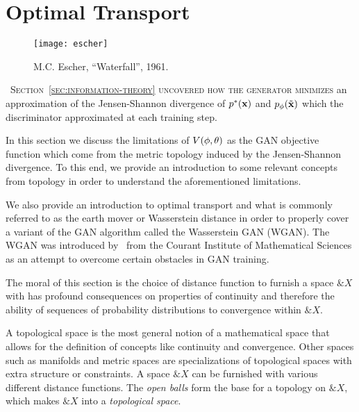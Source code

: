 \section{Optimal Transport}%
\label{sec:optimal-transport}

\vspace{1cm}

\begin{figure}[h]%
  \label{fig:paradise}
  \centering
   {
    \texttt{[image: escher]}
  }
  \caption{M.C. Escher, ``Waterfall'', 1961.}
\end{figure}

\vspace{1cm}

\lettrine[lines=3]{\Royal~S}{ection~\ref{sec:information-theory}
  uncovered how the generator minimizes} an approximation of the
Jensen-Shannon divergence of $p^*(\mathbf{x})$ and $p_{\phi}(\tilde{\mathbf{x}})$ which the discriminator
approximated at each training step.

In this section we discuss the limitations of $V(\phi, \theta)$ as the GAN
objective function which come from the metric topology induced by the
Jensen-Shannon divergence. To this end, we provide an introduction to
some relevant concepts from topology in order to understand the
aforementioned limitations.

We also provide an introduction to optimal transport and what is
commonly referred to as the earth mover or Wasserstein distance in
order to properly cover a variant of the GAN algorithm called the
Wasserstein GAN (WGAN). The WGAN was introduced
by~\cite{ref:arjovsky-2017} from the Courant Institute of Mathematical
Sciences as an attempt to overcome certain obstacles in GAN training.

The moral of this section is the choice of distance function to
furnish a space $\&X$ with has profound consequences on properties of
continuity and therefore the ability of sequences of probability
distributions to convergence within $\&X$.


A topological space is the most general notion of a mathematical space
that allows for the definition of concepts like continuity and
convergence.  Other spaces such as manifolds and metric spaces are
specializations of topological spaces with extra structure or
constraints.  A space $\&X$ can be furnished with various different
distance functions.  The \textit{open balls} form the base for a
topology on $\&X$, which makes $\&X$ into a \textit{topological
  space}.

